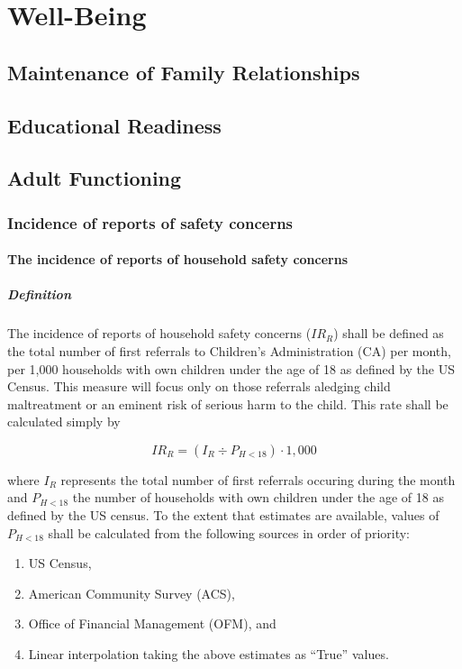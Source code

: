 \documentclass[12pt]{article}\usepackage[]{graphicx}\usepackage[]{color}
\begin{document}
\section{Well-Being}

\subsection{Maintenance of Family Relationships}

\subsection{Educational Readiness}

\subsection{Adult Functioning}


\subsubsection{Incidence of reports of safety concerns}

\paragraph{The incidence of reports of household safety concerns}

\subparagraph{Definition} The incidence of reports of household safety concerns ($IR_R$) shall be defined as the total number of first referrals to Children's Administration (CA) per month, per 1,000 households with own children under the age of 18 as defined by the US Census. This measure will focus only on those referrals aledging child maltreatment or an eminent risk of serious harm to the child. This rate shall be calculated simply by 

\begin{equation}\label{eq:IRR}
IR_R = (I_R \div P_{H<18}) \cdot 1,000
\end{equation}

where $I_R$ represents the total number of first referrals occuring during the month and $P_{H<18}$ the number of households with own children under the age of 18 as defined by the US census. To the extent that estimates are available, values of $P_{H<18}$ shall be calculated from the following sources in order of priority:

\begin{enumerate}
  \item US Census,
  \item American Community Survey (ACS), 
  \item Office of Financial Management (OFM), and 
  \item Linear interpolation taking the above estimates as ``True'' values. 
\end{enumerate}
\end{document}
